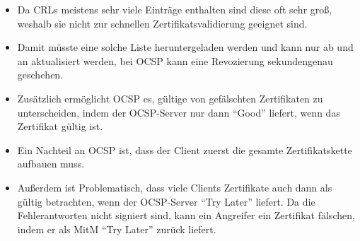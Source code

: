             \begin{itemize}
            	\item Da CRLs meistens sehr viele Einträge enthalten sind diese oft sehr groß, weshalb sie nicht zur schnellen Zertifikatsvalidierung geeignet sind.
            	\item Damit müsste eine solche Liste heruntergeladen werden und kann nur ab und an aktualisiert werden, bei OCSP kann eine Revozierung sekundengenau geschehen.
            	\item Zusätzlich ermöglicht OCSP es, gültige von gefälschten Zertifikaten zu unterscheiden, indem der OCSP-Server nur dann \enquote{Good} liefert, wenn das Zertifikat gültig ist.
            	\item Ein Nachteil an OCSP ist, dass der Client zuerst die gesamte Zertifikatskette aufbauen muss.
            	\item Außerdem ist Problematisch, dass viele Clients Zertifikate auch dann als gültig betrachten, wenn der OCSP-Server \enquote{Try Later} liefert. Da die Fehlerantworten nicht signiert sind, kann ein Angreifer ein Zertifikat fälschen, indem er als MitM \enquote{Try Later} zurück liefert.
            \end{itemize}

